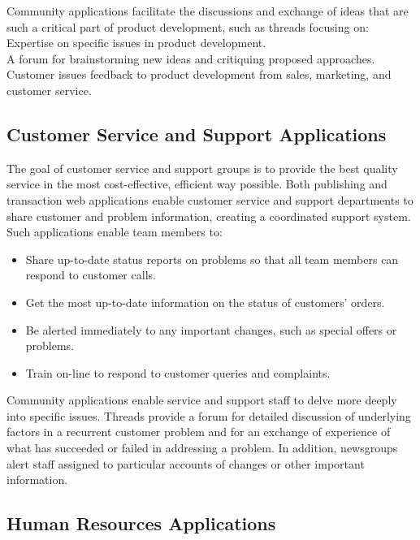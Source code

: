 Community applications facilitate the discussions and exchange of ideas
that are such a critical part of product development, such as threads
focusing on:\\
Expertise on specific issues in product development.\\

A forum for brainstorming new ideas and critiquing proposed approaches.\\

Customer issues feedback to product development from sales, marketing,
and customer service.

\subsection{Customer Service and Support Applications}

The goal of customer service and support groups is to provide the best
quality service in the most cost-effective, efficient way possible.
Both publishing and transaction web applications enable customer
service and support departments to share customer and problem
information, creating a coordinated support system. Such applications
enable team members to:
\begin{itemize}
  \item Share up-to-date status reports on problems so that all team
members can respond to customer calls.
  \item Get the most up-to-date information on the status of customers'
orders.
  \item Be alerted immediately to any important changes, such as special
offers or problems.
  \item Train on-line to respond to customer queries and complaints.
\end{itemize}

Community applications enable service and support staff to delve more
deeply into specific issues. Threads provide a forum for detailed
discussion of underlying factors in a recurrent customer problem and
for an exchange of experience of what has succeeded or failed in
addressing a problem. In addition, newsgroups alert staff assigned to
particular accounts of changes or other important information.

\subsection{Human Resources Applications}

